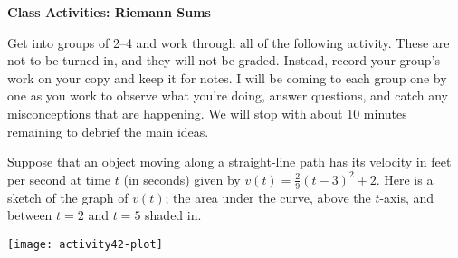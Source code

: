 \documentclass[11pt]{article}
\begin{document}
	
	\thispagestyle{empty}
	\renewcommand{\headrulewidth}{0.0pt}
	\thispagestyle{fancy}
	\lfoot{}
	\cfoot{}
	\rfoot{}	
	
	\vspace*{0in}

		\begin{center}
			\begin{large}
			\textbf{Class Activities: Riemann Sums} \\
			\end{large}
		\end{center}
	
Get into groups of 2--4 and work through all of the following activity. These are not to be turned in, and they will not be graded. Instead, record your group's work on your copy and keep it for notes. I will be coming to each group one by one as you work to observe what you're doing, answer questions, and catch any misconceptions that are happening. We will stop with about 10 minutes remaining to debrief the main ideas.\\

\bigskip

Suppose that an object moving along a straight-line path has its velocity in feet per second at time $t$ (in seconds) given by $v(t) = \frac{2}{9}(t-3)^2 + 2$. Here is a sketch of the graph of $v(t)$;  the area under the curve, above the $t$-axis, and between $t=2$ and $t=5$ shaded in. 

\begin{center}
	\texttt{[image: activity42-plot]}
\end{center}
\end{document}
